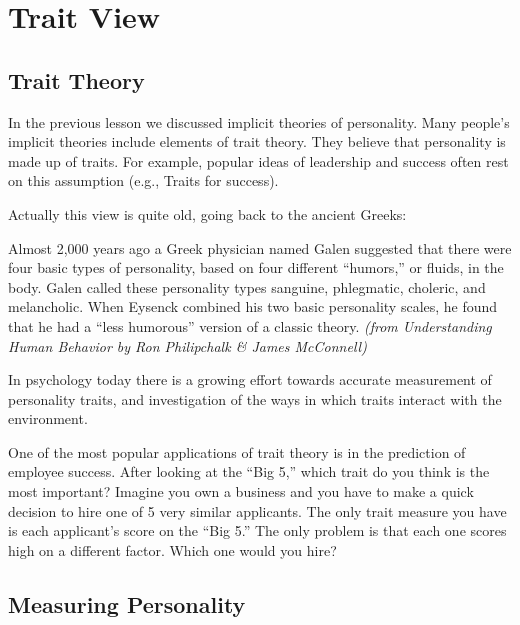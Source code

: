 \documentclass[
]{book}
\begin{document}
\hypertarget{trait-view}{%
\section{Trait View}\label{trait-view}}

\hypertarget{trait-theory}{%
\subsection*{Trait Theory}\label{trait-theory}}

In the previous lesson we discussed implicit theories of personality. Many people's implicit theories include elements of trait theory. They believe that personality is made up of traits. For example, popular ideas of leadership and success often rest on this assumption (e.g., Traits for success).

Actually this view is quite old, going back to the ancient Greeks:

Almost 2,000 years ago a Greek physician named Galen suggested that there were four basic types of personality, based on four different ``humors,'' or fluids, in the body. Galen called these personality types sanguine, phlegmatic, choleric, and melancholic. When Eysenck combined his two basic personality scales, he found that he had a ``less humorous'' version of a classic theory. \emph{(from Understanding Human Behavior by Ron Philipchalk \& James McConnell)}

In psychology today there is a growing effort towards accurate measurement of personality traits, and investigation of the ways in which traits interact with the environment.

One of the most popular applications of trait theory is in the prediction of employee success. After looking at the ``Big 5,'' which trait do you think is the most important? Imagine you own a business and you have to make a quick decision to hire one of 5 very similar applicants. The only trait measure you have is each applicant's score on the ``Big 5.'' The only problem is that each one scores high on a different factor. Which one would you hire?

\hypertarget{measuring-personality}{%
\subsection*{Measuring Personality}\label{measuring-personality}}
\end{document}
